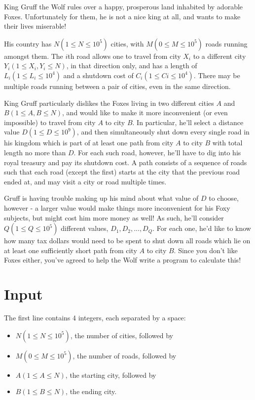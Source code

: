 King Gruff the Wolf rules over a happy, prosperous land inhabited by adorable Foxes. Unfortunately for them, he is not a nice king at all, and wants to make their lives miserable!

His country has $N (1 \leq N \leq 10^5)$ cities, with $M (0 \leq M \leq 10^5)$ roads running amongst them. The $i$th road allows one to travel from city $X_i$ to a different city $Y_i (1 \leq X_i,Y_i \leq N)$, in that direction only, and has a length of $L_i (1 \leq L_i \leq 10^4)$ and a shutdown cost of $C_i (1 \leq Ci \leq 10^4)$. There may be multiple roads running between a pair of cities, even in the same direction.

King Gruff particularly dislikes the Foxes living in two different cities $A$ and $B (1 \leq A,B \leq N)$, and would like to make it more inconvenient (or even impossible) to travel from city $A$ to city $B$. In particular, he'll select a distance value $D (1 \leq D \leq 10^9)$, and then simultaneously shut down every single road in his kingdom which is part of at least one path from city $A$ to city $B$ with total length no more than $D$. For each such road, however, he'll have to dig into his royal treasury and pay its shutdown cost. A path consists of a sequence of roads such that each road (except the first) starts at the city that the previous road ended at, and may visit a city or road multiple times.

Gruff is having trouble making up his mind about what value of $D$ to choose, however - a larger value would make things more inconvenient for his Foxy subjects, but might cost him more money as well! As such, he'll consider $Q (1 \leq Q \leq 10^5)$ different values, $D_1, D_2, ..., D_Q$. For each one, he'd like to know how many tax dollars would need to be spent to shut down all roads which lie on at least one sufficiently short path from city $A$ to city $B$. Since you don't like Foxes either, you've agreed to help the Wolf write a program to calculate this!

\section*{Input}
The first line contains 4 integers, each separated by a space:

\begin{itemize}
\item $N (1 \leq N \leq 10^5)$, the number of cities, followed by
\item $M (0 \leq M \leq 10^5)$, the number of roads, followed by
\item $A (1 \leq A \leq N)$, the starting city, followed by
\item $B (1 \leq B \leq N)$, the ending city.
\end{itemize}

